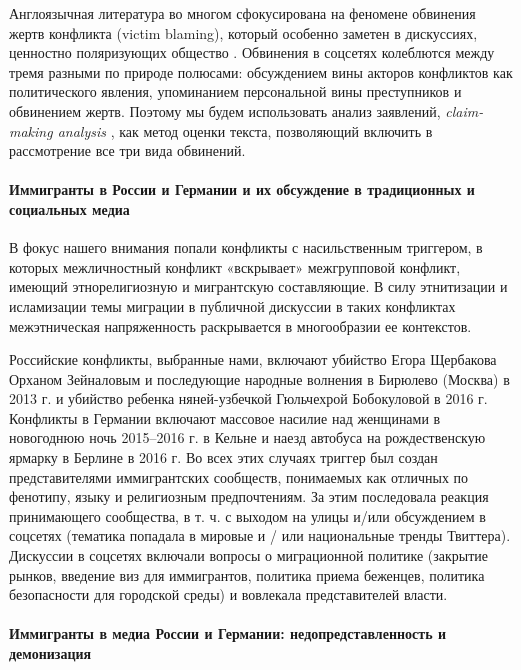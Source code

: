 Англоязычная литература во многом сфокусирована на феномене обвинения жертв конфликта (victim blaming), который особенно заметен в дискуссиях, ценностно поляризующих общество \cite{StubbsRichardsonRaderCosby}. Обвинения в соцсетях колеблются между тремя разными по природе полюсами: обсуждением вины акторов конфликтов как политического явления, упоминанием персональной вины преступников и обвинением жертв. Поэтому мы будем использовать анализ заявлений, \textit{claim-making analysis} \cite{KoopmansStatham}, как метод оценки текста, позволяющий включить в рассмотрение все три вида обвинений.

\paragraph{Иммигранты в России и Германии и их обсуждение в традиционных и социальных медиа}

В фокус нашего внимания попали конфликты с насильственным триггером, в которых межличностный конфликт «вскрывает» межгрупповой конфликт, имеющий этнорелигиозную и мигрантскую составляющие. В силу этнитизации и исламизации темы миграции в публичной дискуссии \cite{Malakhov,BodrunovaKoltsovaKoltcov} в таких конфликтах межэтническая напряженность раскрывается в многообразии ее контекстов.

Российские конфликты, выбранные нами, включают убийство Егора Щербакова Орханом Зейналовым и последующие народные волнения в Бирюлево (Москва) в 2013 г. и убийство ребенка няней-узбечкой Гюльчехрой Бобокуловой в 2016 г. Конфликты в Германии включают массовое насилие над женщинами в новогоднюю ночь 2015--2016 г. в Кельне и наезд автобуса на рождественскую ярмарку в Берлине в 2016 г. Во всех этих случаях триггер был создан представителями иммигрантских сообществ, понимаемых как отличных по фенотипу, языку и религиозным предпочтениям. За этим последовала реакция принимающего сообщества, в т. ч. с выходом на улицы и/или обсуждением в соцсетях (тематика попадала в мировые и / или национальные тренды Твиттера). Дискуссии в соцсетях включали вопросы о миграционной политике (закрытие рынков, введение виз для иммигрантов, политика приема беженцев, политика безопасности для городской среды) и вовлекала представителей власти.

\paragraph{Иммигранты в медиа России и Германии: недопредставленность и демонизация}

